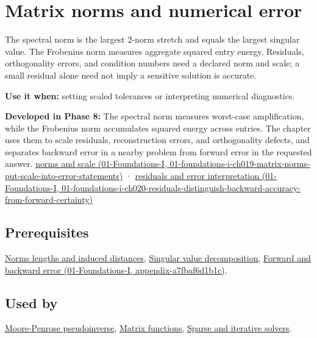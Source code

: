 \hypertarget{appendix-f8657bac66e5}{}
\section{Matrix norms and numerical error}\label{appendix-f8657bac66e5-matrix-norms-and-numerical-error}

The spectral norm is the largest 2-norm stretch and equals the largest singular value. The Frobenius norm measures aggregate squared entry energy. Residuals, orthogonality errors, and condition numbers need a declared norm and scale; a small residual alone need not imply a sensitive solution is accurate.

\textbf{Use it when:} setting scaled tolerances or interpreting numerical diagnostics.

\textbf{Developed in Phase 8:} The spectral norm measures worst-case amplification, while the Frobenius norm accumulates squared energy across entries. The chapter uses them to scale residuals, reconstruction errors, and orthogonality defects, and separates backward error in a nearby problem from forward error in the requested answer. \href{../01-Foundations-I/main.pdf\#nameddest=01-foundations-i-ch019-matrix-norms-put-scale-into-error-statements}{norms and scale (01-Foundations-I, 01-foundations-i-ch019-matrix-norms-put-scale-into-error-statements)} · \href{../01-Foundations-I/main.pdf\#nameddest=01-foundations-i-ch020-residuals-distinguish-backward-accuracy-from-forward-certainty}{residuals and error interpretation (01-Foundations-I, 01-foundations-i-ch020-residuals-distinguish-backward-accuracy-from-forward-certainty)}

\subsection{Prerequisites}\label{appendix-f8657bac66e5-prerequisites}

\hyperref[appendix-49933872bb51]{Norms lengths and induced distances}, \hyperref[appendix-1fad5e7f36fa]{Singular value decomposition}, \href{../01-Foundations-I/main.pdf\#nameddest=appendix-a7fbaf6d1b1c}{Forward and backward error (01-Foundations-I, appendix-a7fbaf6d1b1c)}.

\subsection{Used by}\label{appendix-f8657bac66e5-used-by}

\hyperref[appendix-541306fdbc1b]{Moore-Penrose pseudoinverse}, \hyperref[appendix-0f4bc2bf2b1f]{Matrix functions}, \hyperref[appendix-67c87a3d9e94]{Sparse and iterative solvers}.

